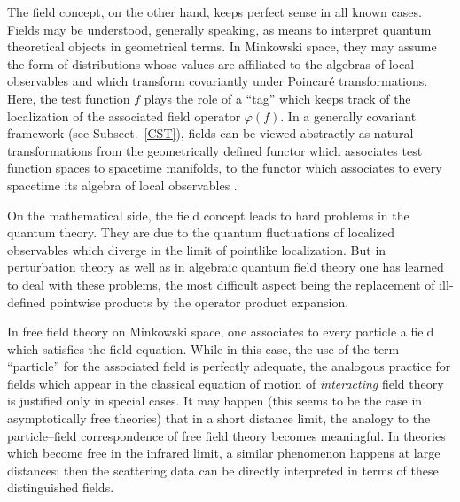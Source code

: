 \documentclass[multphys,vecphys]{svmult}
\begin{document}
The field concept, on the other hand, keeps perfect sense in all 
known cases. Fields may be understood, generally speaking, as means to 
interpret quantum theoretical objects in geometrical terms. In 
Minkowski space, they may assume the form of distributions whose 
values are affiliated to the algebras of local observables and which 
transform covariantly under Poincar\'{e} transformations.  Here, the
test function $f$ plays the role of a ``tag'' which keeps track of the 
localization of the associated field operator $\varphi(f)$. 
In a generally covariant framework (see
Subsect.\ \ref{CST}), fields can be viewed abstractly as natural
transformations from the geometrically defined functor which associates
test function spaces to spacetime manifolds, to the functor which
associates to every spacetime its algebra of local
observables \cite{BFV}.    

On the mathematical side, the field concept leads to hard problems in
the quantum theory. They are due to the quantum fluctuations of
localized observables which diverge
in the limit of pointlike localization. But in
perturbation theory as well as in
algebraic quantum field theory one has
learned to deal with these problems, the most difficult aspect 
being the replacement of ill-defined pointwise products by the
operator product expansion.  

In free field theory on Minkowski space, one associates to every 
particle a field which satisfies the field equation.
While in this case, the use of the term ``particle'' for the
associated field is perfectly adequate, the analogous practice for
fields which appear in the classical equation of motion of 
{\em interacting} field theory is justified only in special cases. 
It may happen (this seems to be the case in asymptotically free theories) that in a short distance limit, the
analogy to the particle--field correspondence of free field theory
becomes meaningful. In theories which become free in the infrared
limit, a similar phenomenon happens at large distances; then the
scattering data can be directly interpreted in terms
of these distinguished fields. 
\end{document}
